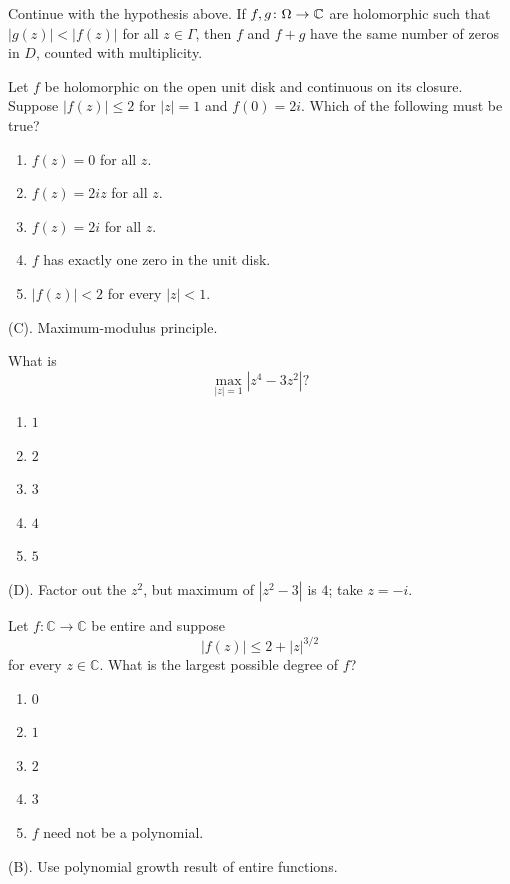 \begin{corollary}
Continue with the hypothesis above. If $f,g \colon \Omega \rightarrow \mathbb{C}$ are holomorphic 
such that $|g(z)|<|f(z)|$ for all $z \in \Gamma$, then $f$ and $f+g$ have the same
number of zeros in $D$, counted with multiplicity.
\end{corollary}


\begin{exercise}
Let $f$ be holomorphic on the open unit disk
and continuous on its closure. Suppose $|f(z)|\le 2$ for $|z|=1$
and $f(0)=2i$. Which of the following must be true?
\begin{enumerate}[label=(\Alph*)]
\item $f(z)=0$ for all $z$.
\item $f(z)=2iz$ for all $z$.
\item $f(z)=2i$ for all $z$.
\item $f$ has exactly one zero in the unit disk.
\item $|f(z)|<2$ for every $|z|<1$.
\end{enumerate}
\end{exercise}
\begin{solution}
(C). Maximum-modulus principle.
\end{solution}

\begin{exercise}
What is
\[
\max_{|z|=1}|z^4-3z^2|?
\]
\begin{enumerate}[label=(\Alph*)]
\item $1$
\item $2$
\item $3$
\item $4$
\item $5$
\end{enumerate}
\end{exercise}
\begin{solution}
(D). Factor out the $z^2$, but maximum of $|z^2 - 3|$ is $4$; take $z = -i$.
\end{solution}

\begin{exercise}
Let $f:\mathbb C\to\mathbb C$ be entire
and suppose
\[
|f(z)|\le 2+|z|^{3/2}
\]
for every $z\in\mathbb C$. What is the largest possible degree of $f$?
\begin{enumerate}[label=(\Alph*)]
\item $0$
\item $1$
\item $2$
\item $3$
\item $f$ need not be a polynomial.
\end{enumerate}
\end{exercise}
\begin{solution}
(B). Use polynomial growth result of entire functions.
\end{solution}

